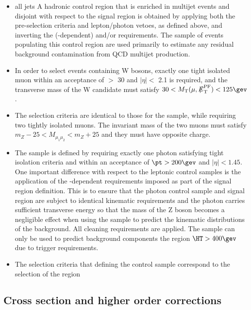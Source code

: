 \begin{itemize}

  \item{all jets} A hadronic control region that is enriched in multijet events and disjoint with respect to the signal region is obtained by applying both the pre-selection criteria and lepton/photon vetoes, as defined above, and inverting the (\HT-dependent) \alphat and/or \mhtmet requirements.  The sample of events populating this control region are used primarily to estimate any residual background contamination from QCD multijet production.

  \item{\mj} In order to select events containing W bosons, exactly one tight isolated muon within an acceptance of \PT $>$ 30 \gev and $|\eta| <$ 2.1 is required, and the transverse mass of the W candidate must satisfy $30 < \mt(\mu,\pfmet) < 125\gev$. 

  \item{\mmj} The selection criteria are identical to those for the \mj sample, while requiring two tightly isolated muons. The invariant mass of the two muons must satisfy $m_{Z} - 25 < M_{\mu_1\mu_2} < m_{Z} +25$ and they must have opposite charge.

  \item{\gj} The \gj sample is defined by requiring exactly one photon satisfying tight isolation criteria and within an acceptance of $\pt > 200\gev$ and $|\eta| < 1.45$. One important difference with respect to the leptonic control samples is the application of the \HT-dependent \alphat requirements imposed as part of the signal region definition. This is to ensure that the photon control sample and signal region are subject to identical kinematic requirements and the photon carries sufficient transverse energy so that the mass of the Z boson becomes a negligible effect when using the \gj sample to predict the kinematic distributions of the \znunu background. All cleaning requirements are applied. The \gj sample can only be used to predict background components the region $\HT > 400\gev$ due to trigger requirements.

  \item{\eej} The selection criteria that defining the \eej control sample correspond to the selection of the \mjj region

\end{itemize}



\subsection{Cross section and higher order corrections}

